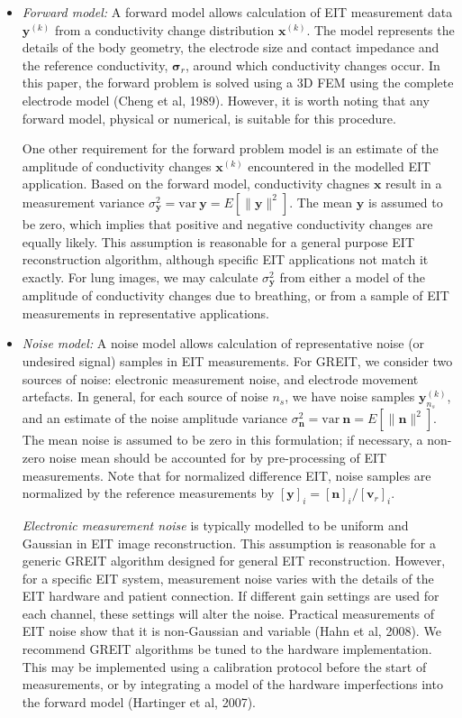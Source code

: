 \documentclass[12pt]{iopart}
\newcommand{\vB}{\mbox{$\mathbf{v}$}}
\newcommand{\xB}{\mbox{$\mathbf{x}$}}
\newcommand{\nB}{\mbox{$\mathbf{n}$}}
\newcommand{\yB}{\mbox{$\mathbf{y}$}}
\newcommand{\sG}{\mbox{${\boldsymbol \sigma}$}}
\begin{document}
\begin{itemize}
\item
{\em Forward model:}
A forward model allows calculation of EIT
 measurement
data $\yB^{(k)}$ from a conductivity change distribution $\xB^{(k)}$.
The model represents the details of the body geometry,
the electrode size and contact impedance and the reference
conductivity, $\sG_r$, around which conductivity changes occur.
In this paper, the forward problem is solved using a
3D FEM using the complete electrode model
(Cheng et al, 1989). However, it is worth noting that 
any forward model, physical or numerical, is suitable
for this procedure.

One other requirement for the forward problem model is
an estimate of the amplitude of conductivity changes $\xB^{(k)}$
encountered in the modelled EIT application. Based on the
forward model, conductivity chagnes $\xB$ result in
a measurement variance
$\sigma_{\yB}^2 = \mathrm{var}~\yB = E[ \| \yB \|^2 ]$. 
The mean $\yB$ is assumed to be zero, which implies
that positive and negative conductivity changes are
equally likely. This assumption is reasonable for a 
general purpose EIT reconstruction algorithm, although
specific EIT applications not match it exactly.
For lung images, we may calculate $\sigma_{\yB}^2$ from either
a model of the amplitude of conductivity changes due
to breathing, or from a sample of EIT measurements 
in representative applications.

\item
{\em Noise model:}
A noise model allows calculation of representative 
noise (or undesired signal) samples in EIT measurements.
For GREIT, we consider two sources of noise:
electronic measurement noise, and
electrode movement artefacts. In general, for each
source of noise $n_s$, we have noise samples $\yB^{(k)}_{n_s}$,
and an estimate of the noise amplitude variance
 $\sigma_{\nB}^2 = \mathrm{var}~\nB = E[ \| \nB \|^2 ]$. 
The mean noise is assumed to be zero in this formulation;
if necessary, a non-zero noise mean should be accounted for
by pre-processing of EIT measurements.
Note that for normalized difference EIT,
noise samples are normalized by the
reference measurements by $[\yB]_i = [\nB ]_i / [\vB_r]_i$.

\hspace{5mm}
{\em Electronic measurement noise}
is typically modelled to be uniform and Gaussian in EIT
image reconstruction. This assumption is reasonable for
a generic GREIT algorithm designed for general EIT reconstruction.
However, for a specific EIT system, measurement noise
varies with the details of the EIT hardware and patient
connection. If different gain settings are used for each
channel, these settings will alter the noise. Practical
measurements of EIT noise show that it is non-Gaussian and
variable (Hahn et al, 2008). We recommend GREIT algorithms
be tuned to the hardware implementation. This may be 
implemented using a calibration protocol before the 
start of measurements, or by integrating a model of 
the hardware imperfections into the forward model
(Hartinger et al, 2007).


\end{itemize}
\end{document}

